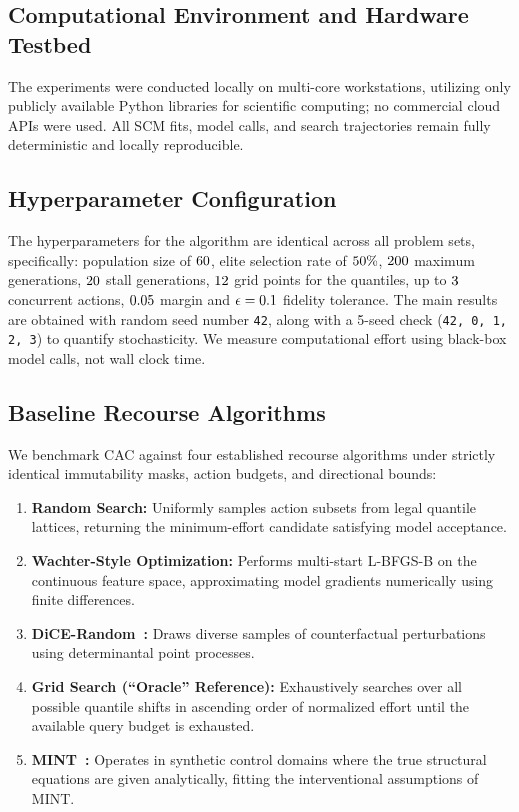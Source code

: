 \documentclass[nolineno]{paper/ieee-access/ieeeaccess}%
\newcommand{\CAC}{CAC}
\newcommand{\artifact}[1]{\nolinkurl{#1}}
\begin{document}
\subsection{Computational Environment and Hardware Testbed}
The experiments were conducted locally on multi-core workstations, utilizing only publicly available Python libraries for scientific computing; no commercial cloud APIs were used. All SCM fits, model calls, and search trajectories remain fully deterministic and locally reproducible.

\subsection{Hyperparameter Configuration}
The hyperparameters for the algorithm are identical across all problem sets, specifically: population size of $60{}$, elite selection rate of $50{}\%$, $200{}$ maximum generations, $20{}$ stall generations, $12{}$ grid points for the quantiles, up to $3{}$ concurrent actions, $0.05{}$ margin and $\epsilon=0.1{}$ fidelity tolerance. The main results are obtained with random seed number \artifact{42}, along with a 5-seed check (\artifact{42, 0, 1, 2, 3}) to quantify stochasticity. We measure computational effort using black-box model calls, not wall clock time.

\subsection{Baseline Recourse Algorithms}
We benchmark \CAC{} against four established recourse algorithms under strictly identical immutability masks, action budgets, and directional bounds:
\begin{enumerate}
\item \textbf{Random Search:} Uniformly samples action subsets from legal quantile lattices, returning the minimum-effort candidate satisfying model acceptance.
\item \textbf{Wachter-Style Optimization:} Performs multi-start L-BFGS-B on the continuous feature space, approximating model gradients numerically using finite differences.
\item \textbf{DiCE-Random~\cite{mothilal2020dice}:} Draws diverse samples of counterfactual perturbations using determinantal point processes.
\item \textbf{Grid Search (``Oracle'' Reference):} Exhaustively searches over all possible quantile shifts in ascending order of normalized effort until the available query budget is exhausted.
\item \textbf{MINT~\cite{karimi2020imperfect}:} Operates in synthetic control domains where the true structural equations are given analytically, fitting the interventional assumptions of MINT.
\end{enumerate}
\end{document}
